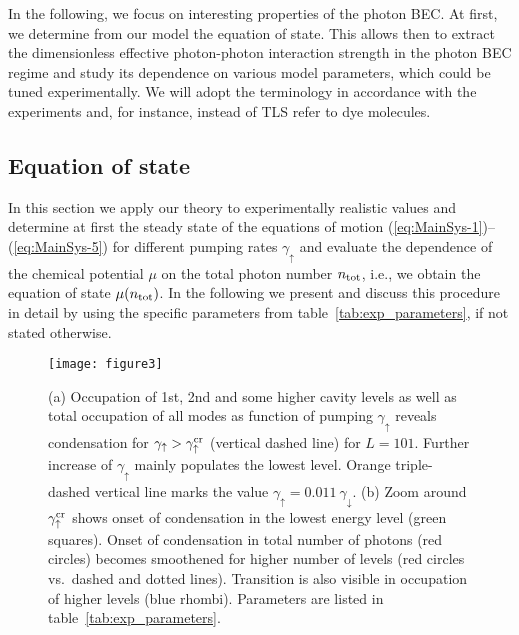 \documentclass[12pt, a4paper]{iopart}
\begin{document}
In the following, we focus on interesting properties of the photon BEC. At first, we determine from our model the equation of state. This allows then to extract the dimensionless effective photon-photon interaction strength in the photon BEC regime and study its dependence on various model parameters, which could be tuned experimentally. We will adopt the terminology in accordance with the experiments and, for instance, instead of TLS refer to dye molecules.


\subsection{Equation of state}

In this section we apply our theory to experimentally realistic values and determine at first the steady state of the equations of motion (\ref{eq:MainSys-1})--(\ref{eq:MainSys-5}) for different pumping rates $\gamma_\uparrow$ and evaluate the dependence of the chemical potential $\mu$ on the total photon number $n_{\rm tot}$, i.e., we obtain the equation of state $\mu(n_{\rm tot})$. In the following we present and discuss this procedure in detail by using the specific parameters from table~\ref{tab:exp_parameters}, if not stated otherwise. 

\begin{figure}[!t]
\centering
\texttt{[image: figure3]}
\caption{(a) Occupation of 1st, 2nd and some higher cavity levels as well as total occupation of all modes as function of pumping $\gamma_\uparrow$ reveals condensation for $\gamma_\uparrow > \gamma_\uparrow^{\rm cr}$ (vertical dashed line) for $L=101$. Further increase of $\gamma_\uparrow$ mainly populates the lowest level. Orange triple-dashed vertical line marks the value $\gamma_\uparrow = 0.011~\gamma_\downarrow$.
(b) Zoom around $\gamma_\uparrow^{\rm cr}$ shows onset of condensation in the lowest energy level (green squares). Onset of condensation in total number of photons (red circles) becomes smoothened for higher number of levels (red circles vs.~dashed and dotted lines). Transition is also visible in occupation of higher levels (blue rhombi). Parameters are listed in table~\ref{tab:exp_parameters}.}
\label{fig:occ-mu-plot}
\end{figure}
\end{document}
